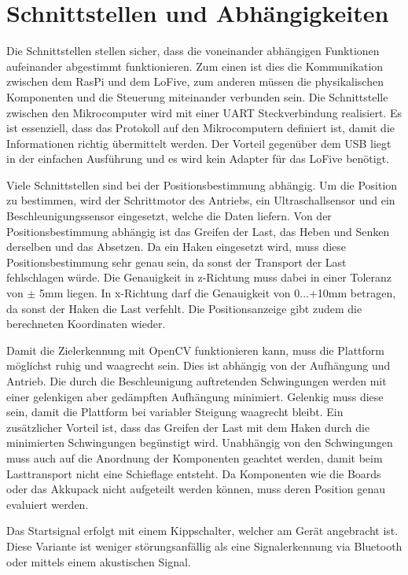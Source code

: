 \documentclass[a4paper]{report}
\begin{document}
\section{Schnittstellen und Abhängigkeiten}
\label{sec:SchnittAbhang}

Die Schnittstellen stellen sicher, dass die voneinander abhängigen Funktionen aufeinander abgestimmt funktionieren. Zum einen ist dies die Kommunikation zwischen dem RasPi und dem LoFive, zum anderen müssen die physikalischen Komponenten und die Steuerung miteinander verbunden sein. Die Schnittstelle zwischen den Mikrocomputer wird mit einer UART Steckverbindung realisiert. Es ist essenziell, dass das Protokoll auf den Mikrocomputern definiert ist, damit die Informationen richtig übermittelt werden. Der Vorteil gegenüber dem USB liegt in der einfachen Ausführung und es wird kein Adapter für das LoFive benötigt.

Viele Schnittstellen sind bei der Positionsbestimmung abhängig. Um die Position zu bestimmen, wird der Schrittmotor des Antriebs, ein Ultraschallsensor und ein Beschleunigungssensor eingesetzt, welche die Daten liefern. Von der Positionsbestimmung abhängig ist das Greifen der Last, das Heben und Senken derselben und das Absetzen. Da ein Haken eingesetzt wird, muss diese Positionsbestimmung sehr genau sein, da sonst der Transport der Last fehlschlagen würde. Die Genauigkeit in z-Richtung muss dabei in einer Toleranz von $\pm$ 5mm liegen. In x-Richtung darf die Genauigkeit von 0...+10mm betragen, da sonst der Haken die Last verfehlt. Die Positionsanzeige gibt zudem die berechneten Koordinaten wieder.

Damit die Zielerkennung mit OpenCV funktionieren kann, muss die Plattform möglichst ruhig und waagrecht sein. Dies ist abhängig von der Aufhängung und Antrieb. Die durch die Beschleunigung auftretenden Schwingungen werden mit einer gelenkigen aber gedämpften Aufhängung minimiert. Gelenkig muss diese sein, damit die Plattform bei variabler Steigung waagrecht bleibt. Ein zusätzlicher Vorteil ist, dass das Greifen der Last mit dem Haken durch die minimierten Schwingungen begünstigt wird. Unabhängig von den Schwingungen muss auch auf die Anordnung der Komponenten geachtet werden, damit beim Lasttransport nicht eine Schieflage entsteht. Da Komponenten wie die Boards oder das Akkupack nicht aufgeteilt werden können, muss deren Position genau evaluiert werden.

Das Startsignal erfolgt mit einem Kippschalter, welcher am Gerät angebracht ist. Diese Variante ist weniger störungsanfällig als eine Signalerkennung via Bluetooth oder mittels einem akustischen Signal.
\end{document}
